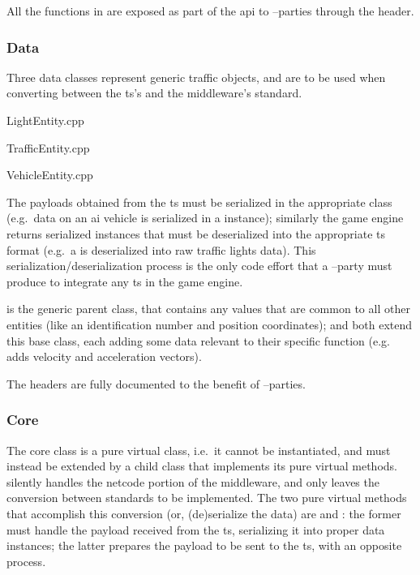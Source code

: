 All the functions in  are exposed as part of the \gls{api} to --parties through the  header.

\subsubsection{Data}

Three data classes represent generic traffic objects, and are to be used when converting between the \gls{ts}'s and the \gls{middleware}'s standard.

\begin{filelist}
	\item LightEntity.cpp
	\item TrafficEntity.cpp
	\item VehicleEntity.cpp
\end{filelist}

The \glspl{payload} obtained from the \gls{ts} must be serialized in the appropriate class (e.g.\ data on an \gls{ai} vehicle is serialized in a  instance); similarly the game engine returns serialized instances that must be deserialized into the appropriate \gls{ts} format (e.g.\ a  is deserialized into raw traffic lights data). This serialization/deserialization process is the only code effort that a --party must produce to integrate any \gls{ts} in the game engine.

 is the generic parent class, that contains any values that are common to all other entities (like an identification number and position coordinates);  and  both extend this base class, each adding some data relevant to their specific function (e.g.\  adds velocity and acceleration vectors).

The headers are fully documented to the  benefit of --parties.

\subsubsection{Core}

The core class is a  pure virtual class, i.e.\ it cannot be instantiated, and must instead be extended by a child class that implements its pure virtual methods.  silently handles the netcode portion of the \gls{middleware}, and only leaves the conversion between standards to be implemented. The two pure virtual methods that accomplish this conversion (or, (de)serialize the data) are  and : the former must handle the \gls{payload} received from the \gls{ts}, serializing it into proper data instances; the latter prepares the \gls{payload} to be sent to the \gls{ts}, with an opposite process.

